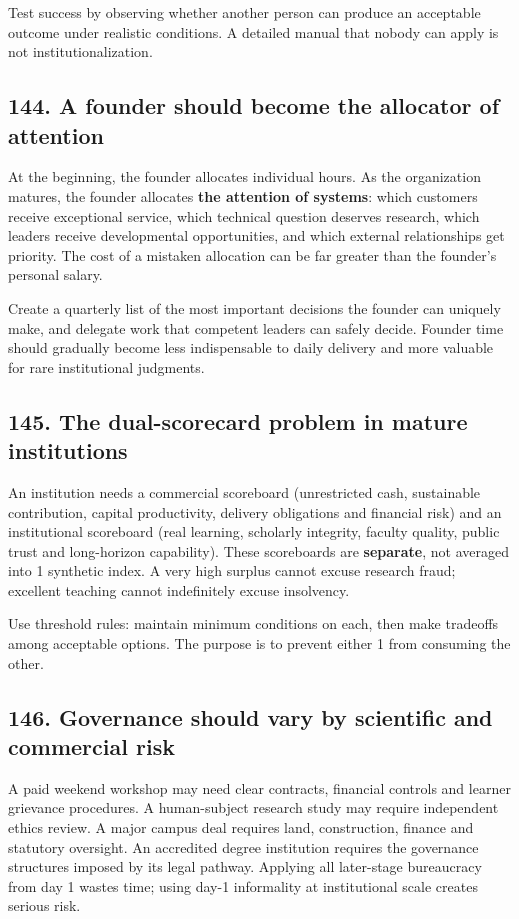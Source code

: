 Test success by observing whether another person can produce an acceptable outcome under realistic conditions. A detailed manual that nobody can apply is not institutionalization.

\subsection{144. A founder should become the allocator of attention}

At the beginning, the founder allocates individual hours. As the organization matures, the founder allocates \textbf{the attention of systems}: which customers receive exceptional service, which technical question deserves research, which leaders receive developmental opportunities, and which external relationships get priority. The cost of a mistaken allocation can be far greater than the founder's personal salary.

Create a quarterly list of the most important decisions the founder can uniquely make, and delegate work that competent leaders can safely decide. Founder time should gradually become less indispensable to daily delivery and more valuable for rare institutional judgments.

\subsection{145. The dual-scorecard problem in mature institutions}

An institution needs a commercial scoreboard (unrestricted cash, sustainable contribution, capital productivity, delivery obligations and financial risk) and an institutional scoreboard (real learning, scholarly integrity, faculty quality, public trust and long-horizon capability). These scoreboards are \textbf{separate}, not averaged into 1 synthetic index. A very high surplus cannot excuse research fraud; excellent teaching cannot indefinitely excuse insolvency.

Use threshold rules: maintain minimum conditions on each, then make tradeoffs among acceptable options. The purpose is to prevent either 1 from consuming the other.

\subsection{146. Governance should vary by scientific and commercial risk}

A paid weekend workshop may need clear contracts, financial controls and learner grievance procedures. A human-subject research study may require independent ethics review. A major campus deal requires land, construction, finance and statutory oversight. An accredited degree institution requires the governance structures imposed by its legal pathway. Applying all later-stage bureaucracy from day 1 wastes time; using day-1 informality at institutional scale creates serious risk.

